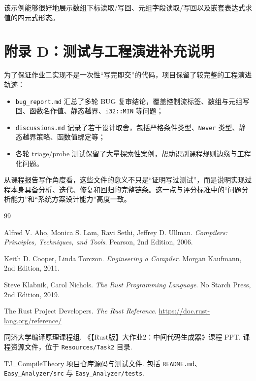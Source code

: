 \documentclass[UTF8,a4paper,12pt]{ctexart}
\newcommand{\pkg}[1]{\texttt{#1}}
\begin{document}
该示例能够很好地展示数组下标读取/写回、元组字段读取/写回以及嵌套表达式求值的四元式形态。

\section{附录 D：测试与工程演进补充说明}

为了保证作业二实现不是一次性“写完即交”的代码，项目保留了较完整的工程演进轨迹：

\begin{itemize}
    \item \pkg{bug\_report.md} 汇总了多轮 BUG 复审结论，覆盖控制流标签、数组与元组写回、函数名作值、静态越界、\pkg{i32::MIN} 等问题；
    \item \pkg{discussions.md} 记录了若干设计取舍，包括严格条件类型、\pkg{Never} 类型、静态越界策略、函数值绑定等；
    \item 各轮 triage/probe 测试保留了大量探索性案例，帮助识别课程规则边缘与工程化问题。
\end{itemize}

从课程报告写作角度看，这些文件的意义不只是“证明写过测试”，而是说明实现过程本身具备分析、迭代、修复和回归的完整链条。这一点与评分标准中的“问题分析能力”和“系统方案设计能力”高度一致。

\begin{thebibliography}{99}

Alfred V. Aho, Monica S. Lam, Ravi Sethi, Jeffrey D. Ullman.
\newblock \emph{Compilers: Principles, Techniques, and Tools}.
\newblock Pearson, 2nd Edition, 2006.

Keith D. Cooper, Linda Torczon.
\newblock \emph{Engineering a Compiler}.
\newblock Morgan Kaufmann, 2nd Edition, 2011.

Steve Klabnik, Carol Nichols.
\newblock \emph{The Rust Programming Language}.
\newblock No Starch Press, 2nd Edition, 2019.

The Rust Project Developers.
\newblock \emph{The Rust Reference}.
\newblock \url{https://doc.rust-lang.org/reference/}

同济大学编译原理课程组.
\newblock 《【Rust版】大作业2：中间代码生成器》课程 PPT.
\newblock 课程资源文件，位于 \pkg{Resources/Task2} 目录.

TJ\_CompileTheory 项目仓库源码与测试文件.
\newblock 包括 \pkg{README.md}、\pkg{Easy\_Analyzer/src} 与 \pkg{Easy\_Analyzer/tests}.

\end{thebibliography}
\end{document}
